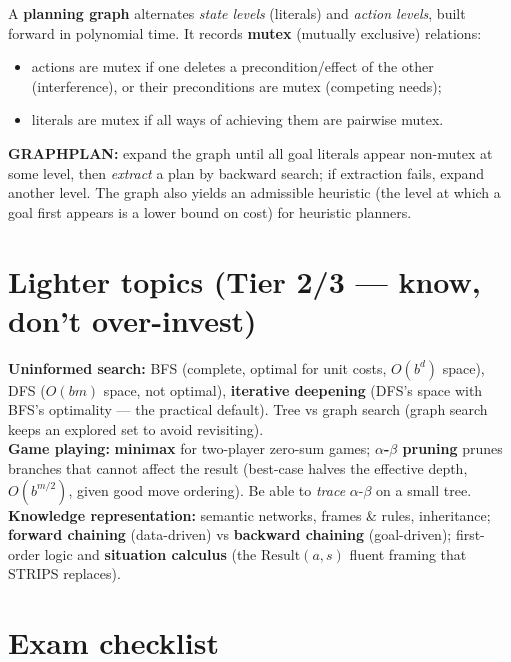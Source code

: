 \documentclass[11pt,a4paper]{article}
\begin{document}
\begin{must}[title=Planning graphs / GRAPHPLAN (the bit to add)]
A \textbf{planning graph} alternates \emph{state levels} (literals) and \emph{action levels}, built forward in polynomial time. It records \textbf{mutex} (mutually exclusive) relations:
\begin{itemize}[leftmargin=*,itemsep=0pt]
  \item actions are mutex if one deletes a precondition/effect of the other (interference), or their preconditions are mutex (competing needs);
  \item literals are mutex if all ways of achieving them are pairwise mutex.
\end{itemize}
\textbf{GRAPHPLAN:} expand the graph until all goal literals appear non-mutex at some level, then \emph{extract} a plan by backward search; if extraction fails, expand another level. The graph also yields an admissible heuristic (the level at which a goal first appears is a lower bound on cost) for heuristic planners.
\end{must}

\section{Lighter topics (Tier 2/3 --- know, don't over-invest)}

\begin{useful}
\textbf{Uninformed search:} BFS (complete, optimal for unit costs, $O(b^d)$ space), DFS ($O(bm)$ space, not optimal), \textbf{iterative deepening} (DFS's space with BFS's optimality --- the practical default). Tree vs graph search (graph search keeps an explored set to avoid revisiting). \\[2pt]
\textbf{Game playing:} \textbf{minimax} for two-player zero-sum games; \textbf{$\alpha$-$\beta$ pruning} prunes branches that cannot affect the result (best-case halves the effective depth, $O(b^{m/2})$, given good move ordering). Be able to \emph{trace} $\alpha$-$\beta$ on a small tree. \\[2pt]
\textbf{Knowledge representation:} semantic networks, frames \& rules, inheritance; \textbf{forward chaining} (data-driven) vs \textbf{backward chaining} (goal-driven); first-order logic and \textbf{situation calculus} (the $\mathrm{Result}(a,s)$ fluent framing that STRIPS replaces).
\end{useful}

\section*{Exam checklist}
\end{document}
